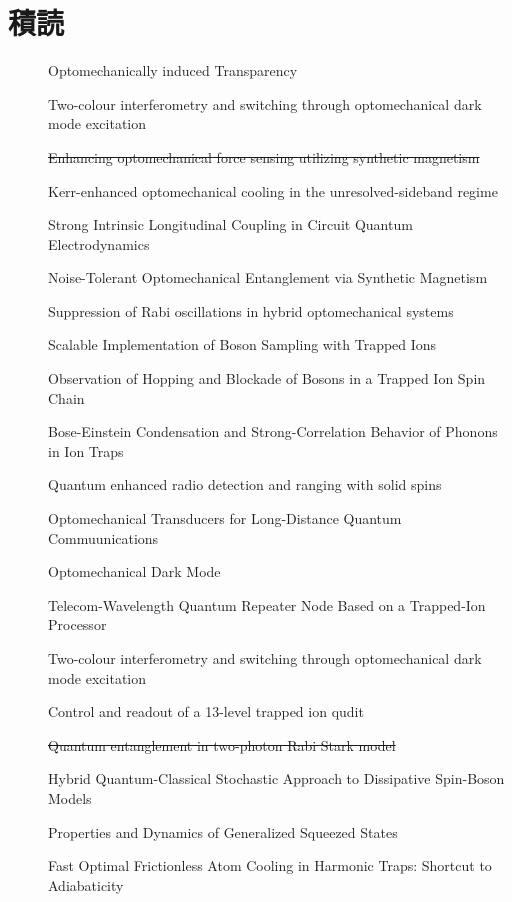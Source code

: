 \documentclass{report}
\begin{document}
  \chapter*{積読}
    \begin{description}
      \item[\cite{science.1195596}] Optomechanically induced Transparency
      \item[\cite{lake2020two}] Two-colour interferometry and switching through optomechanical dark mode excitation
      \item[\cite{PhysRevA.111.053508}] \sout{Enhancing optomechanical force sensing utilizing synthetic magnetism}
      \item[\cite{PhysRevA.111.053505}] Kerr-enhanced optomechanical cooling in the unresolved-sideband regime
      \item[\cite{PhysRevLett.134.153603}] Strong Intrinsic Longitudinal Coupling in Circuit Quantum Electrodynamics
      \item[\cite{PhysRevLett.129.063602}] Noise-Tolerant Optomechanical Entanglement via Synthetic Magnetism
      \item[\cite{PhysRevA.92.043822}] Suppression of Rabi oscillations in hybrid optomechanical systems
      \item[\cite{PhysRevLett.112.050504}] Scalable Implementation of Boson Sampling with Trapped Ions
      \item[\cite{PhysRevLett.120.073001}] Observation of Hopping and Blockade of Bosons in a Trapped Ion Spin Chain
      \item[\cite{PhysRevLett.93.263602}] Bose-Einstein Condensation and Strong-Correlation Behavior of Phonons in Ion Traps
      \item[\cite{chen2023quantum}] Quantum enhanced radio detection and ranging with solid spins
      \item[\cite{PhysRevLett.105.220501}] Optomechanical Transducers for Long-Distance Quantum Commuunications
      \item[\cite{science.1228370}] Optomechanical Dark Mode
      \item[\cite{PhysRevLett.130.213601}] Telecom-Wavelength Quantum Repeater Node Based on a Trapped-Ion Processor
      \item[\cite{lake2020two}] Two-colour interferometry and switching through optomechanical dark mode excitation
      \item[\cite{low2025control}] Control and readout of a 13-level trapped ion qudit 
      \item[\cite{boutakka2025quantum}] \sout{Quantum entanglement in two-photon Rabi Stark model}
      \item[\cite{PhysRevX.15.021073}] Hybrid Quantum-Classical Stochastic Approach to Dissipative Spin-Boson Models
      \item[\cite{ashhabPropertiesDynamicsGeneralized2025b}] Properties and Dynamics of Generalized Squeezed States
      \item[\cite{PhysRevLett.104.063002}] Fast Optimal Frictionless Atom Cooling in Harmonic Traps: Shortcut to Adiabaticity
    \end{description}
  \printbibliography
\end{document}
